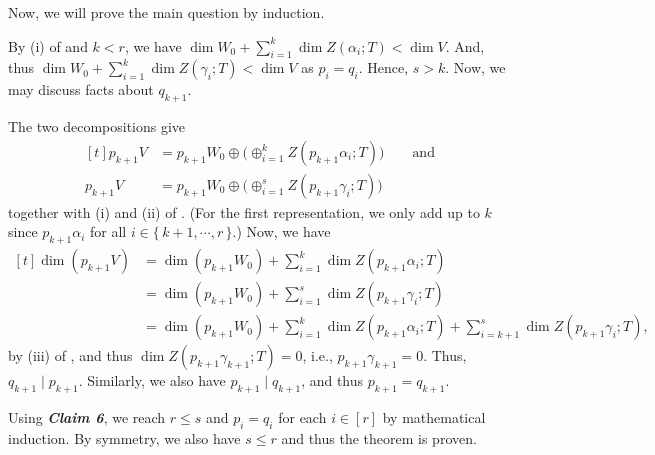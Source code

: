 \documentclass[MAS212_Note.tex]{subfiles}
\begin{document}
{    Now, we will prove the main question by induction.

    By (i) of  and \(k < r\),
    we have \(\dim W_0 + \sum_{i=1}^k \dim Z(\alpha_i; T) < \dim V\).
    And, thus \(\dim W_0 + \sum_{i=1}^k \dim Z(\gamma_i; T) < \dim V\) as \(p_i = q_i\).
    Hence, \(s > k\). Now, we may discuss facts about \(q_{k+1}\).

    The two decompositions give
    \[\begin{aligned}[t]
        p_{k+1}V &= p_{k+1}W_0 \oplus \big(\oplus_{i=1}^k Z(p_{k+1} \alpha_i; T)\big) \qquad\text{and}\\
        p_{k+1}V &= p_{k+1}W_0 \oplus \big(\oplus_{i=1}^s Z(p_{k+1} \gamma_i; T)\big)
    \end{aligned}\]
    together with (i) and (ii) of .
    (For the first representation, we only add up to \(k\) since \(p_{k+1} \alpha_i\)
    for all \(i \in \{\,k+1,\cdots,r\,\}\).)
    Now, we have
    \[\begin{aligned}[t]
        \dim (p_{k+1}V) &= \textstyle \dim (p_{k+1}W_0) + \sum_{i=1}^k \dim Z(p_{k+1} \alpha_i; T) \\
                        &= \textstyle \dim (p_{k+1}W_0) + \sum_{i=1}^s \dim Z(p_{k+1} \gamma_i; T) \\
                        &= \textstyle \dim (p_{k+1}W_0) + \sum_{i=1}^k \dim Z(p_{k+1} \alpha_i; T) + \sum_{i=k+1}^{s} \dim Z(p_{k+1} \gamma_i; T),
    \end{aligned}\]
    by (iii) of , and thus
    \(\dim Z(p_{k+1} \gamma_{k+1}; T) = 0\), i.e., \(p_{k+1} \gamma_{k+1} = 0\).
    Thus, \(q_{k+1} \mid p_{k+1}\).
    Similarly, we also have \(p_{k+1} \mid q_{k+1}\), and thus \(p_{k+1} = q_{k+1}\). \checkmark

    Using \textbf{\textit{Claim 6}}, we reach \(r \le s\) and \(p_i = q_i\) for each \(i \in [r]\)
    by mathematical induction.
    By symmetry, we also have \(s \le r\) and thus the theorem is proven.
}

\end{document}
